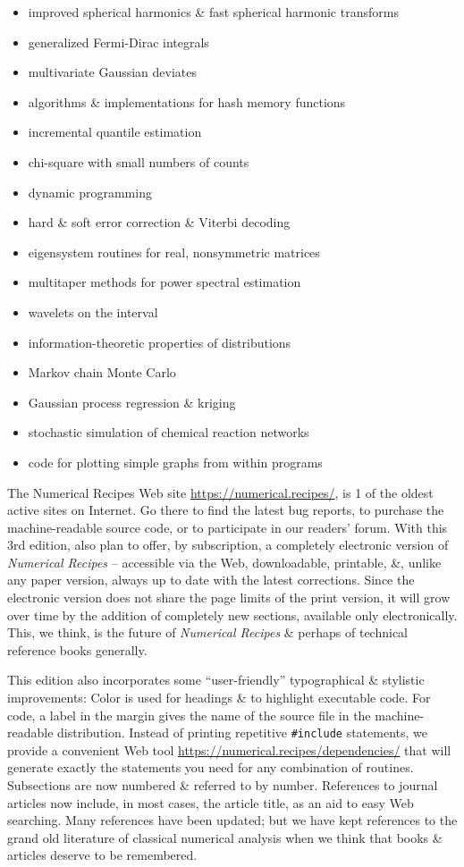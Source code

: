 \documentclass{article}
\begin{document}
\begin{enumerate}
\begin{itemize}
		\item improved spherical harmonics \& fast spherical harmonic transforms
		\item generalized Fermi-Dirac integrals
		\item multivariate Gaussian deviates
		\item algorithms \& implementations for hash memory functions
		\item incremental quantile estimation
		\item chi-square with small numbers of counts
		\item dynamic programming
		\item hard \& soft error correction \& Viterbi decoding
		\item eigensystem routines for real, nonsymmetric matrices
		\item multitaper methods for power spectral estimation
		\item wavelets on the interval
		\item information-theoretic properties of distributions
		\item Markov chain Monte Carlo
		\item Gaussian process regression \& kriging
		\item stochastic simulation of chemical reaction networks
		\item code for plotting simple graphs from within programs
	\end{itemize}
	The Numerical Recipes Web site \url{https://numerical.recipes/}, is 1 of the oldest active sites on Internet. Go there to find the latest bug reports, to purchase the machine-readable source code, or to participate in our readers' forum. With this 3rd edition, also plan to offer, by subscription, a completely electronic version of {\it Numerical Recipes} -- accessible via the Web, downloadable, printable, \&, unlike any paper version, always up to date with the latest corrections. Since the electronic version does not share the page limits of the print version, it will grow over time by the addition of completely new sections, available only electronically. This, we think, is the future of {\it Numerical Recipes} \& perhaps of technical reference books generally.
	
	This edition also incorporates some ``user-friendly'' typographical \& stylistic improvements: Color is used for headings \& to highlight executable code. For code, a label in the margin gives the name of the source file in the machine-readable distribution. Instead of printing repetitive \verb|#include| statements, we provide a convenient Web tool \url{https://numerical.recipes/dependencies/} that will generate exactly the statements you need for any combination of routines. Subsections are now numbered \& referred to by number. References to journal articles now include, in most cases, the article title, as an aid to easy Web searching. Many references have been updated; but we have kept references to the grand old literature of classical numerical analysis when we think that books \& articles deserve to be remembered.
	

\end{enumerate}
\end{document}
